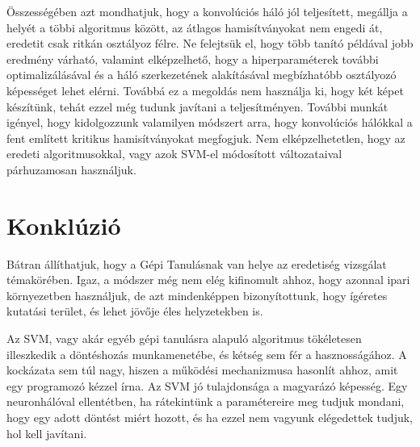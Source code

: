 \addtocounter{footnote}{-1}
\addtocounter{footnote}{1}


%


Összességében azt mondhatjuk, hogy a konvolúciós háló jól teljesített, megállja a helyét 
a többi algoritmus között, az átlagos hamisítványokat nem engedi át, eredetit csak ritkán 
osztályoz félre. Ne felejtsük el, hogy több tanító példával jobb eredmény várható,
valamint elképzelhető, hogy a hiperparaméterek további optimalizálásával és a háló 
szerkezetének alakításával megbízhatóbb osztályozó képességet lehet elérni. 
Továbbá ez a megoldás nem használja ki, hogy két képet készítünk, tehát ezzel még 
tudunk javítani a teljesítményen. További munkát igényel, hogy kidolgozzunk valamilyen
módszert arra, hogy konvolúciós hálókkal a fent említett kritikus hamisítványokat megfogjuk.
Nem elképzelhetetlen, hogy az eredeti algoritmusokkal, vagy azok SVM-el módosított változataival
párhuzamosan használjuk.




%
%
%
%
%
%
%
%










\newpage
\section{Konklúzió}


Bátran állíthatjuk, hogy a Gépi Tanulásnak van helye az eredetiség vizsgálat témakörében.
Igaz, a módszer még nem elég kifinomult ahhoz, hogy azonnal ipari környezetben használjuk,
de azt mindenképpen bizonyítottunk, hogy ígéretes kutatási terület, és lehet jövője éles 
helyzetekben is.


Az SVM, vagy akár egyéb gépi tanulásra alapuló algoritmus tökéletesen illeszkedik
a döntéshozás munkamenetébe, és kétség sem fér a hasznosságához. A kockázata sem 
túl nagy, hiszen a működési mechanizmusa hasonlít ahhoz, amit egy programozó kézzel írna.
Az SVM jó tulajdonsága a magyarázó képesség. Egy neuronhálóval ellentétben, ha rátekintünk
a paramétereire meg tudjuk mondani, hogy egy adott döntést miért hozott, és ha ezzel nem vagyunk 
elégedettek tudjuk, hol kell javítani.


